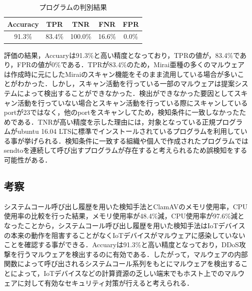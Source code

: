 \begin{table}[h]
     \caption{プログラムの判別結果} 
     \label{tab:result}
     \centering 
    \begin{tabular}{|c|c|c|c|c|} \hline 
    Accuracy & TPR    & TNR     & FNR    & FPR   \\ \hline
    91.3\%   & 83.4\% & 100.0\% & 16.6\% & 0.0\% \\ \hline
    \end{tabular}
\end{table}

評価の結果，Accuaryは91.3\%と高い精度となっており，TPRの値が，83.4\%であり，FPRの値が0\%である．TPRが83.4\%のため，Mirai亜種の多くのマルウェアは作成時に元にしたMiraiのスキャン機能をそのまま流用している場合が多いことがわかった．しかし，スキャン活動を行っている一部のマルウェアは提案システムによって検出することができなかった．検出ができなかった要因としてスキャン活動を行っていない場合とスキャン活動を行っている際にスキャンしているportが23ではなく，他のportをスキャンしてため，検知条件に一致しなかったためである．TNRが高い精度を示した理由には，対象となっている正規プログラムがubuntu 16.04 LTSに標準でインストールされているプログラムを利用している事が挙げられる．検知条件に一致する組織や個人で作成されたプログラムではsendtoを連続して呼び出すプログラムが存在すると考えられるため誤検知をする可能性がある．

\subsection{考察}
システムコール呼び出し履歴を用いた検知手法とClamAVのメモリ使用率，CPU使用率の比較を行った結果，メモリ使用率が48.4\%減，CPU使用率が97.6\%減となったことから，システムコール呼び出し履歴を用いた検知手法はIoTデバイスの本来の動作を阻害することがなくIoTデバイスがマルウェアに感染していないことを確認する事ができる．Accuaryは91.3\%と高い精度となっており，DDoS攻撃を行うマルウェアを検出するのに有効である．したがって，マルウェアの内部関数によって呼び出されるシステムコール系列をもとにマルウェアを検出することによって，IoTデバイスなどの計算資源の乏しい端末でもホスト上でのマルウェアに対して有効なセキュリティ対策が行えると考えられる．